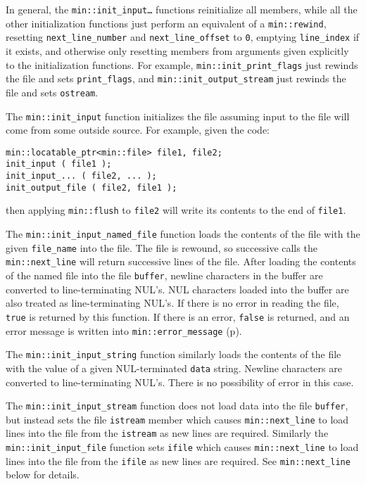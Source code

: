 \documentclass[12pt]{article}
\newcommand{\pagref}[1]{p\pageref{#1}}
\newcommand{\EOL}{\penalty \exhyphenpenalty}
\newenvironment{indpar}[1][0.3in]%
	{\begin{list}{}%
		     {\setlength{\itemsep}{0in}%
		      \setlength{\topsep}{0in}%
		      \setlength{\parsep}{1ex}%
		      \setlength{\labelwidth}{#1}%
		      \setlength{\leftmargin}{#1}%
		      \addtolength{\leftmargin}{\labelsep}}%
	 \item}%
	{\end{list}}
\begin{document}
In general, the {\tt min::\EOL init\_\EOL input\ldots} functions
reinitialize all members, while all the other initialization functions
just perform an equivalent of a {\tt min::rewind}, resetting
{\tt next\_\EOL line\_\EOL number}
and {\tt next\_\EOL line\_\EOL offset} to {\tt 0}, emptying
{\tt line\_\EOL index} if it exists, and otherwise
only resetting members from arguments given explicitly to the
initialization functions.
For example, {\tt min::\EOL init\_\EOL print\_\EOL flags} just
rewinds the file and sets {\tt print\_\EOL flags},
and {\tt min::\EOL init\_\EOL output\_\EOL stream} just
rewinds the file and sets {\tt ostream}.

The {\tt min::init\_input} function initializes the file assuming
input to the file will come from some outside source.  For example,
given the code:
\begin{indpar}\begin{verbatim}
min::locatable_ptr<min::file> file1, file2;
init_input ( file1 );
init_input_... ( file2, ... );
init_output_file ( file2, file1 );
\end{verbatim}\end{indpar}
then applying {\tt min::flush} to {\tt file2} will write
its contents to the end of {\tt file1}.

The {\tt min::init\_input\_named\_file} function loads the contents
of the file with the given {\tt file\_\EOL name} into the file.  The
file is rewound, so successive calls the {\tt min::\EOL next\_\EOL line}
will return successive lines of the file.  After loading the contents
of the named file into the file {\tt buffer}, newline characters in the buffer
are converted to line-terminating NUL's.  NUL characters loaded into the
buffer are also treated as line-terminating NUL's.  If there is no error in
reading the file, {\tt true} is returned by this function.  If
there is an error, {\tt false} is returned, and an error message
is written into {\tt min::\EOL error\_\EOL message}
(\pagref{ERROR_MESSAGE}).

The {\tt min::init\_input\_string} function similarly loads the contents
of the file with the value of a given NUL-terminated {\tt data} string.
Newline characters are converted to line-terminating NUL's.
There is no possibility of error in this case.

The {\tt min::init\_input\_stream} function does not load data into
the file {\tt buffer}, but instead sets the file {\tt istream} member
which causes {\tt min::\EOL next\_\EOL line} to load lines into the
file from the {\tt istream} as new lines are required.  Similarly
the {\tt min::\EOL init\_\EOL input\_\EOL file} function sets
{\tt ifile} which causes {\tt min::\EOL next\_\EOL line} to load lines
into the file from the {\tt ifile} as new lines are required.
See {\tt min::\EOL next\_\EOL line} below for details.
\end{document}
